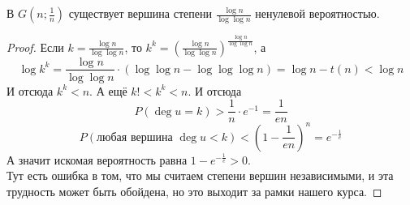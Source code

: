 \documentclass{article}
\begin{document}
    \begin{theorem}
        В $G(n;\frac1n)$ существует вершина степени $\frac{\log n}{\log\log n}$ ненулевой вероятностью.
    \end{theorem}
    \begin{proof}
        Если $k=\frac{\log n}{\log\log n}$, то $k^k=\left(\frac{\log n}{\log\log n}\right)^{\frac{\log n}{\log\log n}}$, а
        $$\log k^k=\frac{\log n}{\log\log n}\cdot\left(\log\log n-\log\log\log n\right)=\log n-t(n)<\log n$$
        И отсюда $k^k<n$. А ещё $k!<k^k<n$. И отсюда
        $$
        P(\deg u=k)>\frac1n\cdot e^{-1}=\frac1{en}
        $$
        $$
        P(\text{любая вершина }\deg u<k)<\left(1-\frac1{en}\right)^n=e^{-\frac1e}
        $$
        А значит искомая вероятность равна $1-e^{-\frac1e}>0$.\\
        Тут есть ошибка в том, что мы считаем степени вершин независимыми, и эта трудность может быть обойдена, но это выходит за рамки нашего курса.
    \end{proof}
\end{document}

